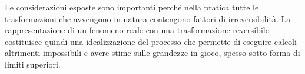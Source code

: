 \documentclass[class=book, crop=false, oneside, 12pt]{standalone}
\begin{document}
Le considerazioni esposte sono importanti perché nella pratica tutte le trasformazioni che avvengono in natura contengono fattori di irreversibilità.  
La rappresentazione di un fenomeno reale con una trasformazione reversibile costituisce quindi una idealizzazione del processo che permette di eseguire calcoli altrimenti impossibili e avere stime sulle grandezze in gioco, spesso sotto forma di limiti superiori.
\end{document}
